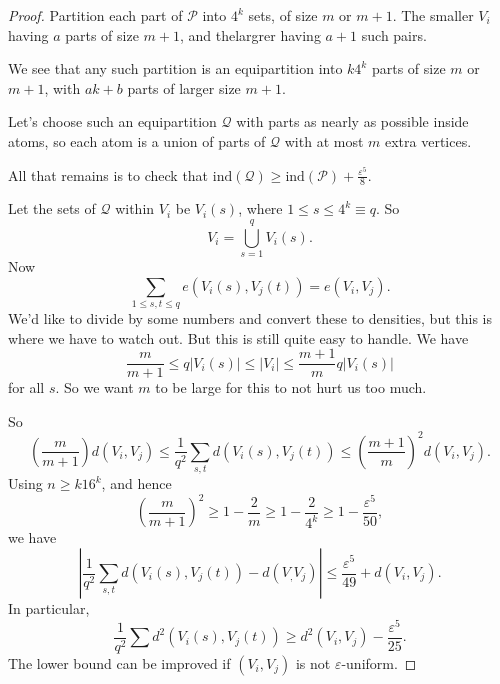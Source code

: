 \documentclass[a4paper]{article}
\newcommand\ind{\mathrm{ind}}
\begin{document}
\begin{proof}
  Partition each part of $\mathcal{P}$ into $4^k$ sets, of size $m$ or $m + 1$. The smaller $V_i$ having $a$ parts of size $m + 1$, and thelargrer having $a + 1$ such pairs.

  We see that any such partition is an equipartition into $k 4^k$ parts of size $m$ or $m + 1$, with $ak + b$ parts of larger size $m + 1$.

  Let's choose such an equipartition $\mathcal{Q}$ with parts as nearly as possible inside atoms, so each atom is a union of parts of $\mathcal{Q}$ with at most $m$ extra vertices.

  All that remains is to check that $\ind (\mathcal{Q}) \geq \ind(\mathcal{P}) + \frac{\varepsilon^5}{8}$.

  Let the sets of $\mathcal{Q}$ within $V_i$ be $V_i(s)$, where $1 \leq s \leq 4^k \equiv q$. So
  \[
    V_i = \bigcup_{s = 1}^q V_i(s).
  \]
  Now
  \[
    \sum_{1 \leq s, t \leq q} e(V_i(s), V_j(t)) = e(V_i, V_j).
  \]
  We'd like to divide by some numbers and convert these to densities, but this is where we have to watch out. But this is still quite easy to handle. We have
  \[
    \frac{m}{m + 1} \leq q |V_i(s)| \leq |V_i| \leq \frac{m + 1}{m} q |V_i(s)|
  \]
  for all $s$. So we want $m$ to be large for this to not hurt us too much.

  So
  \[
    \left(\frac{m}{m + 1}\right) d(V_i, V_j) \leq \frac{1}{q^2} \sum_{s, t} d(V_i(s), V_j(t)) \leq \left(\frac{m + 1}{m}\right)^2 d(V_i, V_j).
  \]
  Using $n \geq k 16^k$, and hence
  \[
    \left(\frac{m}{m + 1}\right)^2 \geq 1 - \frac{2}{m} \geq 1 - \frac{2}{4^k} \geq 1 - \frac{\varepsilon^5}{50},
  \]
  we have
  \[
    \left|\frac{1}{q^2} \sum_{s, t} d(V_i(s), V_j(t)) - d(V_, V_j)\right| \leq \frac{\varepsilon^5}{49} + d(V_i, V_j). %
  \]
  In particular,
  \[
    \frac{1}{q^2} \sum d^2(V_i(s), V_j(t)) \geq d^2(V_i, V_j) - \frac{\varepsilon^5}{25}.
  \]
  The lower bound can be improved if $(V_i, V_j)$ is not $\varepsilon$-uniform.


\end{proof}
\end{document}
